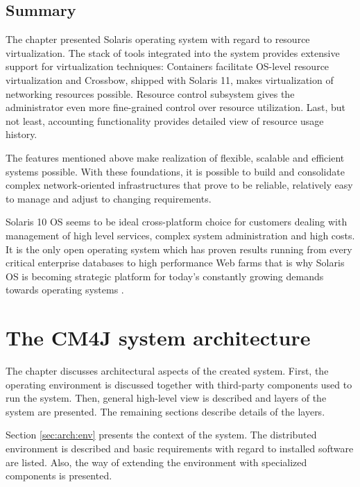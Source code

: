 \documentclass[11pt]{book}
\begin{document}


    \section*{Summary}

      The chapter presented Solaris operating system with regard to resource virtualization. The stack of tools
      integrated into the system provides extensive support for virtualization techniques: Containers facilitate
      OS-level resource virtualization and Crossbow, shipped with Solaris 11, makes virtualization of networking
      resources possible. Resource control subsystem gives the administrator even more fine-grained control over
      resource utilization. Last, but not least, accounting functionality provides detailed view of resource usage
      history.

      The features mentioned above make realization of flexible, scalable and efficient systems possible. With these
      foundations, it is possible to build and consolidate complex network-oriented infrastructures that prove to be
      reliable, relatively easy to manage and adjust to changing requirements.

      Solaris 10 OS seems to be ideal cross-platform choice for customers dealing with management of high level
      services, complex system administration and high costs. It is the only open operating system which has proven
      results running from every critical enterprise databases to high performance Web farms that is why Solaris OS is
      becoming strategic platform for today's constantly growing demands towards operating systems
      \cite{solaris_operating_system}. 


  \chapter{The CM4J system architecture}
  \label{chap:arch}

    The chapter discusses architectural aspects of the created system. First, the operating environment is discussed
    together with third-party components used to run the system. Then, general high-level view is described and
    layers of the system are presented. The remaining sections describe details of the layers.

    Section \ref{sec:arch:env} presents the context of the system. The distributed environment is described and
    basic requirements with regard to installed software are listed. Also, the way of extending the environment with
    specialized components is presented.
\end{document}
